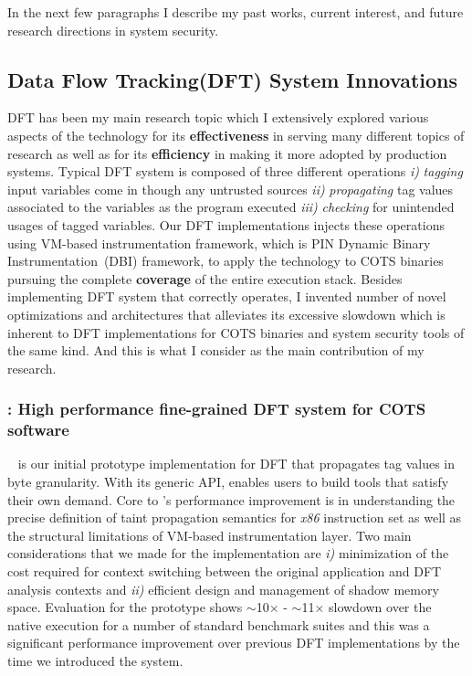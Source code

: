 \documentclass[letterpaper, 10pt]{article}
\begin{document}
\begin{small}
In the next few paragraphs I describe my past works, current interest, and
future research directions in system security.

\subsection*{Data Flow Tracking(DFT) System Innovations}
%
DFT has been my main research topic which I extensively explored various
aspects of the technology for its {\bf effectiveness} in serving many different
topics of research as well as for its {\bf efficiency} in making it more
adopted by production systems.
%
Typical DFT system is composed of three different operations {\it i)} {\it
tagging} input variables come in though any untrusted sources {\it ii)} {\it
propagating} tag values associated to the variables as the program executed
{\it iii)} {\it checking} for unintended usages of tagged variables. 
%
Our DFT implementations injects these operations using VM-based instrumentation
framework, which is PIN Dynamic Binary Instrumentation~(DBI) framework, to
apply the technology to COTS binaries pursuing the complete {\bf coverage} of
the entire execution stack.
%
Besides implementing DFT system that correctly operates, I invented number of
novel optimizations and architectures that alleviates its excessive slowdown
which is inherent to DFT implementations for COTS binaries and system security
tools of the same kind. And this is what I consider as the main contribution of
my research.

\subsubsection*{\libdft: High performance fine-grained DFT system for COTS
software}

\libdft~\cite{libdft:2012vee} is our initial prototype implementation for DFT
that propagates tag values in byte granularity.
%
With its generic API, \libdft enables users to build tools that satisfy their
own demand. 
%
%
Core to \libdft's performance improvement is in understanding the precise
definition of taint propagation semantics for {\it x86} instruction set as well
as the structural limitations of VM-based instrumentation layer. 
%
%
Two main considerations that we made for the implementation are {\it i)}
minimization of the cost required for context switching between the original
application and DFT analysis contexts and {\it ii)} efficient design and
management of shadow memory space.
%
Evaluation for the prototype shows $\sim$10$\times$ - $\sim$11$\times$ slowdown
over the native execution for a number of standard benchmark suites and this
was a significant performance improvement over previous DFT implementations by
the time we introduced the system.


\end{small}
\end{document}
